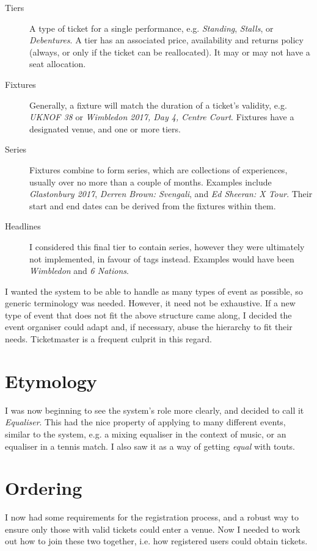 \documentclass[12pt,a4paper]{bhamdissertation}
\begin{document}
\begin{description}
    \item[Tiers] A type of ticket for a single performance, e.g. \textit{Standing}, \textit{Stalls}, or \textit{Debentures}. A tier has an associated price, availability and returns policy (always, or only if the ticket can be reallocated). It may or may not have a seat allocation.
    \item[Fixtures] Generally, a fixture will match the duration of a ticket's validity, e.g. \textit{UKNOF 38} or \textit{Wimbledon 2017, Day 4, Centre Court}. Fixtures have a designated venue, and one or more tiers.
    \item[Series] Fixtures combine to form series, which are collections of experiences, usually over no more than a couple of months. Examples include \textit{Glastonbury 2017}, \textit{Derren Brown: Svengali}, and \textit{Ed Sheeran: X Tour}. Their start and end dates can be derived from the fixtures within them.
    \item[Headlines] I considered this final tier to contain series, however they were ultimately not implemented, in favour of tags instead. Examples would have been \textit{Wimbledon} and \textit{6 Nations}.
\end{description}

I wanted the system to be able to handle as many types of event as possible, so generic terminology was needed. However, it need not be exhaustive. If a new type of event that does not fit the above structure came along, I decided the event organiser could adapt and, if necessary, abuse the hierarchy to fit their needs. Ticketmaster is a frequent culprit in this regard.

\section{Etymology}

I was now beginning to see the system's role more clearly, and decided to call it \textit{Equaliser}. This had the nice property of applying to many different events, similar to the system, e.g. a mixing equaliser in the context of music, or an equaliser in a tennis match. I also saw it as a way of getting \textit{equal} with touts.

\section{Ordering}

I now had some requirements for the registration process, and a robust way to ensure only those with valid tickets could enter a venue. Now I needed to work out how to join these two together, i.e. how registered users could obtain tickets.
\end{document}
